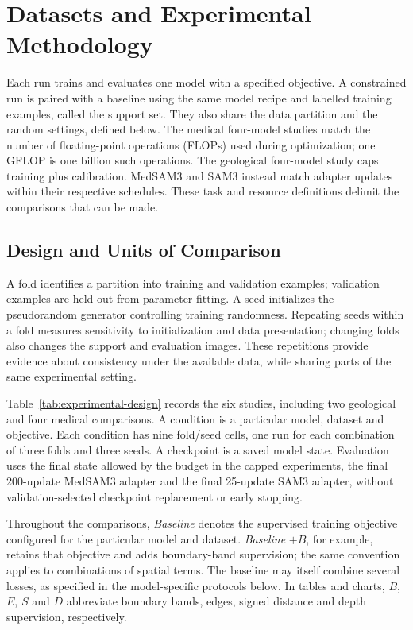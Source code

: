 \section{Datasets and Experimental Methodology}
\label{sec:methodology}

Each run trains and evaluates one model with a specified objective. A
constrained run is paired with a baseline using the same model recipe and
labelled training examples, called the support set. They also share the data
partition and the random settings, defined below. The medical four-model
studies match the number of floating-point operations (FLOPs) used during
optimization; one GFLOP is one billion such operations. The geological
four-model study caps training plus calibration. MedSAM3 and SAM3 instead
match adapter updates within their respective schedules. These task and
resource definitions delimit the comparisons that can be made.

\subsection{Design and Units of Comparison}
\label{sec:experimental-structure}

A fold identifies a partition into training and validation examples;
validation examples are held out from parameter fitting. A seed initializes
the pseudorandom generator controlling training randomness. Repeating seeds
within a fold measures sensitivity to initialization and data presentation;
changing folds also changes the support and evaluation images. These
repetitions provide evidence about consistency under the available data,
while sharing parts of the same experimental setting.

Table~\ref{tab:experimental-design} records the six studies, including two
geological and four medical comparisons. A condition is a particular model,
dataset and objective. Each condition has nine fold/seed cells, one run for
each combination of three folds and three seeds. A checkpoint is a saved
model state. Evaluation uses the final state allowed by the budget in the
capped experiments, the final 200-update MedSAM3 adapter and the final
25-update SAM3 adapter, without validation-selected checkpoint replacement
or early stopping.

Throughout the comparisons, \emph{Baseline} denotes the supervised training
objective configured for the particular model and dataset. \emph{Baseline}
$+B$, for example, retains that objective and adds boundary-band
supervision; the same convention applies to combinations of spatial terms.
The baseline may itself combine several losses, as specified in the
model-specific protocols below. In tables and charts, $B$, $E$, $S$ and $D$
abbreviate boundary bands, edges, signed distance and depth supervision,
respectively.

